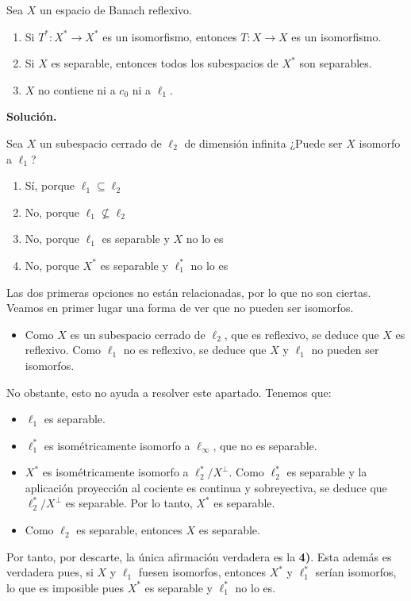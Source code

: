 \documentclass[12pt]{article}
\begin{document}
\begin{ejercicio}
    Sea $X$ un espacio de Banach reflexivo.
    \begin{enumerate}[label={\arabic*)}]
        \item Si $T^*\colon X^*\to X^*$ es un isomorfismo, entonces $T\colon X\to X$ es un isomorfismo.
        \item Si $X$ es separable, entonces todos los subespacios de $X^*$ son separables.
        \item $X$ no contiene ni a $c_0$ ni a $\ell_1$.
    \end{enumerate}
\end{ejercicio}


    \newpage
    \setcounter{ejercicio}{0} %
    \noindent
    \textbf{Solución.}

\begin{ejercicio}
    Sea $X$ un subespacio cerrado de $\ell_{2}$ de dimensión infinita ¿Puede ser $X$ isomorfo a $\ell_1$?
    \begin{enumerate}[label={\arabic*)}]
        \item Sí, porque $\ell_1 \subseteq \ell_{2}$
        \item No, porque $\ell_1 \nsubseteq \ell_{2}$
        \item No, porque $\ell_1$ es separable y $X$ no lo es
        \item No, porque $X^*$ es separable y $\ell_1^*$ no lo es
    \end{enumerate}

    Las dos primeras opciones no están relacionadas, por lo que no son ciertas. Veamos en primer lugar una forma de ver que no pueden ser isomorfos.
    \begin{itemize}
        \item Como $X$ es un subespacio cerrado de $\ell_{2}$, que es reflexivo, se deduce que $X$ es reflexivo. Como $\ell_1$ no es reflexivo, se deduce que $X$ y $\ell_1$ no pueden ser isomorfos.
    \end{itemize}

    No obstante, esto no ayuda a resolver este apartado. Tenemos que:
    \begin{itemize}
        \item $\ell_1$ es separable.
        \item $\ell_{1}^*$ es isométricamente isomorfo a $\ell_\infty$, que no es separable.
        \item $X^*$ es isométricamente isomorfo a $\ell_{2}^*/X^\perp$. Como $\ell_{2}^*$ es separable y la aplicación proyección al cociente es continua y sobreyectiva, se deduce que $\ell_{2}^*/X^\perp$ es separable. Por lo tanto, $X^*$ es separable.
        \item Como $\ell_{2}$ es separable, entonces $X$ es separable.
    \end{itemize}

    Por tanto, por descarte, la única afirmación verdadera es la \textbf{4)}. Esta además es verdadera pues, si $X$ y $\ell_1$ fuesen isomorfos, entonces $X^*$ y $\ell_1^*$ serían isomorfos, lo que es imposible pues $X^*$ es separable y $\ell_1^*$ no lo es.
\end{ejercicio}
\end{document}
